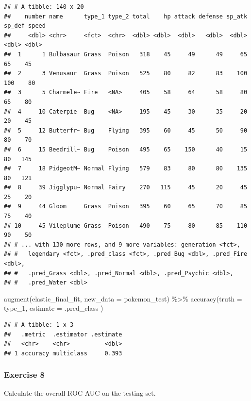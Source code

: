 \documentclass[
]{article}
\newenvironment{Shaded}{\begin{snugshade}}{\end{snugshade}}
\newcommand{\AttributeTok}[1]{\textcolor[rgb]{0.77,0.63,0.00}{#1}}
\newcommand{\FunctionTok}[1]{\textcolor[rgb]{0.00,0.00,0.00}{#1}}
\newcommand{\NormalTok}[1]{#1}
\newcommand{\SpecialCharTok}[1]{\textcolor[rgb]{0.00,0.00,0.00}{#1}}
\begin{document}
\begin{verbatim}
## # A tibble: 140 x 20
##    number name      type_1 type_2 total    hp attack defense sp_atk sp_def speed
##     <dbl> <chr>     <fct>  <chr>  <dbl> <dbl>  <dbl>   <dbl>  <dbl>  <dbl> <dbl>
##  1      1 Bulbasaur Grass  Poison   318    45     49      49     65     65    45
##  2      3 Venusaur  Grass  Poison   525    80     82      83    100    100    80
##  3      5 Charmele~ Fire   <NA>     405    58     64      58     80     65    80
##  4     10 Caterpie  Bug    <NA>     195    45     30      35     20     20    45
##  5     12 Butterfr~ Bug    Flying   395    60     45      50     90     80    70
##  6     15 Beedrill~ Bug    Poison   495    65    150      40     15     80   145
##  7     18 PidgeotM~ Normal Flying   579    83     80      80    135     80   121
##  8     39 Jigglypu~ Normal Fairy    270   115     45      20     45     25    20
##  9     44 Gloom     Grass  Poison   395    60     65      70     85     75    40
## 10     45 Vileplume Grass  Poison   490    75     80      85    110     90    50
## # ... with 130 more rows, and 9 more variables: generation <fct>,
## #   legendary <fct>, .pred_class <fct>, .pred_Bug <dbl>, .pred_Fire <dbl>,
## #   .pred_Grass <dbl>, .pred_Normal <dbl>, .pred_Psychic <dbl>,
## #   .pred_Water <dbl>
\end{verbatim}

\begin{Shaded}
\begin{Highlighting}[]
\FunctionTok{augment}\NormalTok{(elastic\_final\_fit, }\AttributeTok{new\_data =}\NormalTok{ pokemon\_test) }\SpecialCharTok{\%\textgreater{}\%}
  \FunctionTok{accuracy}\NormalTok{(}\AttributeTok{truth =}\NormalTok{ type\_1, }\AttributeTok{estimate =}\NormalTok{ .pred\_class}
\NormalTok{          )}
\end{Highlighting}
\end{Shaded}

\begin{verbatim}
## # A tibble: 1 x 3
##   .metric  .estimator .estimate
##   <chr>    <chr>          <dbl>
## 1 accuracy multiclass     0.393
\end{verbatim}

\hypertarget{exercise-8}{%
\subsubsection{Exercise 8}\label{exercise-8}}

Calculate the overall ROC AUC on the testing set.
\end{document}
